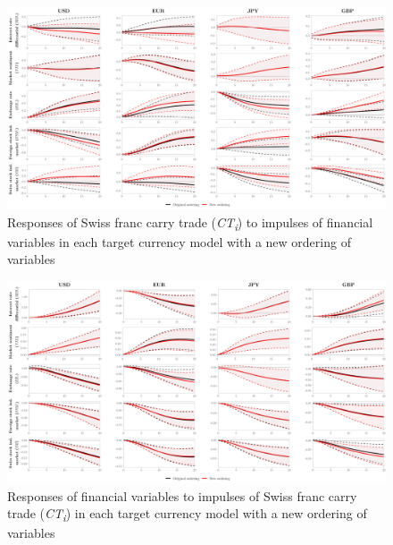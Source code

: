 \documentclass[a4paper, twoside]{templates/ociamthesis}
\begin{document}
\clearpage

\begin{figure}[!ht]

{\centering \includegraphics[width=0.99\columnwidth]{figure/gALL_COIRF20_RESP20_NO} 

}

\caption{Responses of Swiss franc carry trade (\textit{CT\textsubscript{i}}) to impulses of financial variables in each target currency model with a new ordering of variables}\label{fig:FigureD1}
\end{figure}

\begin{figure}[!ht]

{\centering \includegraphics[width=0.99\columnwidth]{figure/gALL_COIRF20_NO} 

}

\caption{Responses of financial variables to impulses of Swiss franc carry trade (\textit{CT\textsubscript{i}}) in each target currency model with a new ordering of variables}\label{fig:FigureD2}
\end{figure}

\clearpage
\end{document}
